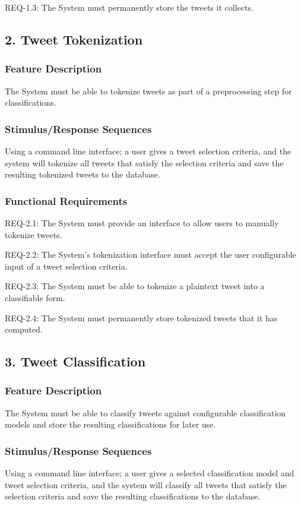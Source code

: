 \documentclass[11pt]{report}
\begin{document}
REQ-1.3: The System must permanently store the tweets it collects.

\subsection*{2. Tweet Tokenization}
\subsubsection*{Feature Description}
The System must be able to tokenize tweets as part of a preprocessing step for classifications.
\subsubsection*{Stimulus/Response Sequences}
Using a command line interface; a user gives a tweet selection criteria, and the system will tokenize all tweets that satisfy the selection criteria and save the resulting tokenized tweets to the database.
\subsubsection*{Functional Requirements}
REQ-2.1: The System must provide an interface to allow users to manually tokenize tweets.

REQ-2.2: The System's tokenization interface must accept the user configurable input of a tweet selection criteria.

REQ-2.3: The System must be able to tokenize a plaintext tweet into a classifiable form.

REQ-2.4: The System must permanently store tokenized tweets that it has computed.
	
\subsection*{3. Tweet Classification}
\subsubsection*{Feature Description}
The System must be able to classify tweets against configurable classification models and store the resulting classifications for later use.
\subsubsection*{Stimulus/Response Sequences}
Using a command line interface; a user gives a selected classification model and tweet selection criteria, and the system will classify all tweets that satisfy the selection criteria and save the resulting classifications to the database.
\end{document}
